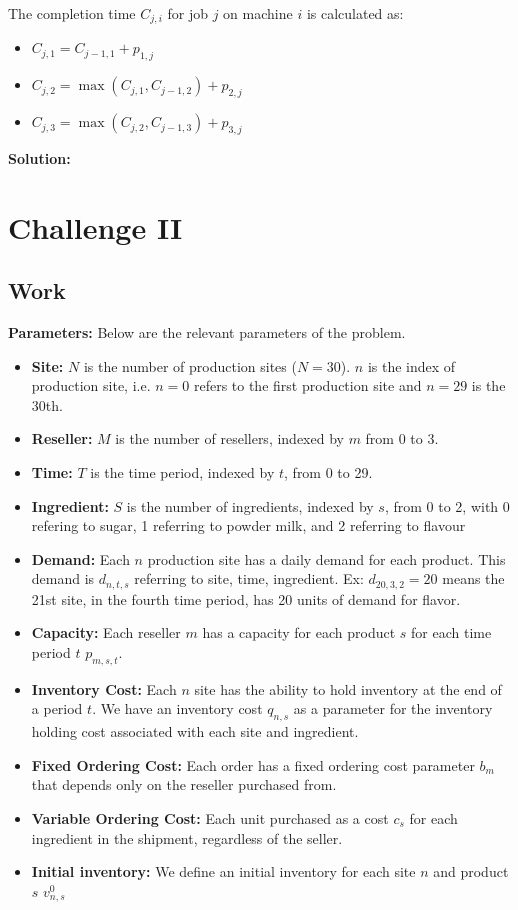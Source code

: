 \documentclass[11pt]{article}
\begin{document}
The completion time $C_{j,i}$ for job $j$ on machine $i$ is calculated as:
\begin{itemize}
    \item $C_{j,1} = C_{j-1,1} + p_{1,j}$
    \item $C_{j,2} = \max(C_{j,1}, C_{j-1,2}) + p_{2,j}$
    \item $C_{j,3} = \max(C_{j,2}, C_{j-1,3}) + p_{3,j}$
\end{itemize}




\textbf{Solution:}

\pagebreak
\section{Challenge II}
\subsection{Work}
\textbf{Parameters: }
Below are the relevant parameters of the problem.
\begin{itemize}
    \item \textbf{Site:} $N$ is the number of production sites ($N=30$). $n$ is the index of production site, i.e. $n=0$ refers to the first production site and $n=29$ is the 30th.
    \item \textbf{Reseller:} $M$ is the number of resellers, indexed by $m$ from 0 to 3.
    \item \textbf{Time: } $T$ is the time period, indexed by $t$, from 0 to 29.
    \item \textbf{Ingredient:} $S$ is the number of ingredients, indexed by $s$, from 0 to 2, with 0 refering to sugar, 1 referring to powder milk, and 2 referring to flavour
    \item \textbf{Demand:} Each $n$ production site has a daily demand for each product.
          This demand is $d_{n,t,s}$ referring to site, time, ingredient.
          Ex: $d_{20,3,2}=20$ means the 21st site, in the fourth time period, has 20 units of demand for flavor.
    \item \textbf{Capacity:} Each reseller $m$ has a capacity for each product $s$ for each time period $t$ $p_{m,s,t}$.
    \item \textbf{Inventory Cost:} Each $n$ site has the ability to hold inventory at the end of a period $t$.
          We have an inventory cost $q_{n,s}$ as a parameter for the inventory holding cost associated with each site and ingredient.
    \item \textbf{Fixed Ordering Cost:} Each order has a fixed ordering cost parameter $b_{m}$ that depends only on the reseller purchased from.
    \item \textbf{Variable Ordering Cost:} Each unit purchased as a cost $c_{s}$ for each ingredient in the shipment, regardless of the seller.
    \item \textbf{Initial inventory: } We define an initial inventory for each site $n$ and product $s$ $v^{0}_{n,s}$
\end{itemize}
\end{document}
